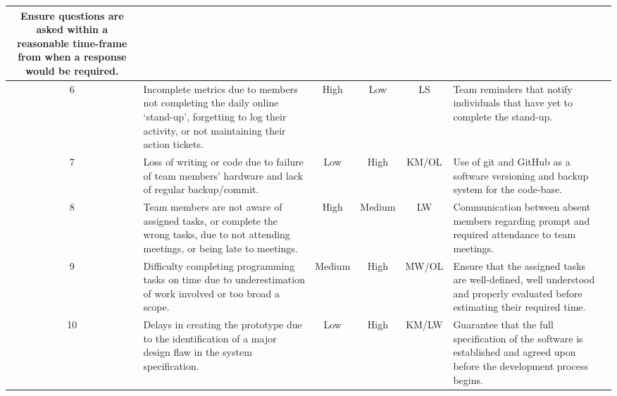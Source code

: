 \begin{table}[h!]
\begin{tabularx}{\textwidth}{|c|X|c|c|c|l|l|}
            Ensure questions are asked within a reasonable time-frame from when a response would be required. \\
            \hline
            6 &
            Incomplete metrics due to members not completing the daily online `stand-up', forgetting to log their activity, or not maintaining their action tickets. &
            High &
            Low & LS &
            Team reminders that notify individuals that have yet to complete the stand-up. \\
            \hline
            7 &
            Loss of writing or code due to failure of team members' hardware and lack of regular backup/commit. &
            Low &
            High & KM/OL &
            Use of git and GitHub as a software versioning and backup system for the code-base. \\
            \hline
            8 &
            Team members are not aware of assigned tasks, or complete the wrong tasks, due to not attending meetings, or being late to meetings. &
            High &
            Medium &
            LW &
            Communication between absent members regarding prompt and required attendance to team meetings. \\
            \hline
            9 &
            Difficulty completing programming tasks on time due to underestimation of work involved or too broad a scope. &
            Medium &
            High &
            MW/OL &
            Ensure that the assigned tasks are well-defined, well understood and properly evaluated before estimating their required time. \\
            \hline
            10 &
            Delays in creating the prototype due to the identification of a major design flaw in the system specification. &
            Low &
            High &
            KM/LW &
            Guarantee that the full specification of the software is established and agreed upon before the development process begins. \\
            \hline
        \end{tabularx}

    \end{table}
